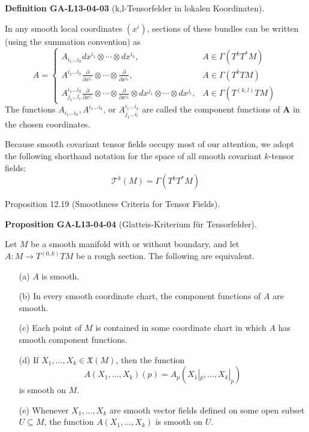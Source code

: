 \documentclass[10pt, letterpaper]{article}
\newcommand{\CustomHeading}[3]{%
  \par\medskip\noindent%
  \textbf{#1 #2} \textnormal{(#3)}.\enskip%
}
\newenvironment{DEF}[2]{\begin{unitbox}\CustomHeading{Definition}{#1}{#2}}{\end{unitbox}}
\newenvironment{PROP}[2]{\begin{unitbox}\CustomHeading{Proposition}{#1}{#2}}{\end{unitbox}}
\begin{document}
\begin{DEF}{GA-L13-04-03}{k,l-Tensorfelder in lokalen Koordinaten}
In any smooth local coordinates $\left(x^{i}\right)$, sections of these bundles can be written (using the summation convention) as
$$
A= \begin{cases}A_{i_{1} \ldots i_{k}} d x^{i_{1}} \otimes \cdots \otimes d x^{i_{k}}, & A \in \Gamma\left(T^{k} T^{*} M\right) \\ A^{i_{1} \ldots i_{k}} \frac{\partial}{\partial x^{i_{1}}} \otimes \cdots \otimes \frac{\partial}{\partial x^{i_{k}}}, & A \in \Gamma\left(T^{k} T M\right) \\ A_{j_{1} \ldots l_{l}}^{i_{1} \ldots i_{k}} \frac{\partial}{\partial x^{i_{1}}} \otimes \cdots \otimes \frac{\partial}{\partial x^{i_{k}}} \otimes d x^{j_{1}} \otimes \cdots \otimes d x^{j_{l}}, & A \in \Gamma\left(T^{(k, l)} T M\right)\end{cases}
$$
The functions $A_{i_{1} \ldots i_{k}}, A^{i_{1} \ldots i_{k}}$, or $A_{j_{1} \ldots i_{l}}^{i_{1} \ldots i_{k}}$ are called the component functions of $\boldsymbol{A}$ in the chosen coordinates.
\end{DEF} 

Because smooth covariant tensor fields occupy most of our attention, we adopt the following shorthand notation for the space of all smooth covariant $k$-tensor fields:
$$
\mathcal{T}^{k}(M)=\Gamma\left(T^{k} T^{*} M\right)
$$


Proposition 12.19 (Smoothness Criteria for Tensor Fields). 


\begin{PROP}{GA-L13-04-04}{Glatteis-Kriterium für Tensorfelder}
Let $M$ be a smooth manifold with or without boundary, and let $A: M \rightarrow T^{(0, k)} T M$ be a rough section. The following are equivalent.
\begin{itemize}
  \item[(a)] $A$ is smooth.
  \item[(b)] In every smooth coordinate chart, the component functions of $A$ are smooth.
  \item[(c)] Each point of $M$ is contained in some coordinate chart in which $A$ has smooth component functions.
  \item[(d)] If $X_1, \ldots, X_k \in \mathfrak{X}(M)$, then the function 
  \[
  A(X_1, \ldots, X_k)(p) = A_p(X_1|_p, \ldots, X_k|_p)
  \]
  is smooth on $M$.
  \item[(e)] Whenever $X_1, \ldots, X_k$ are smooth vector fields defined on some open subset $U \subseteq M$, the function $A(X_1, \ldots, X_k)$ is smooth on $U$.
\end{itemize}
\end{PROP}
\end{document}
